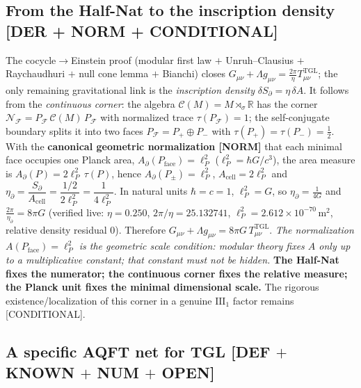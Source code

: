 \documentclass[11pt]{article}
\theoremstyle{definition}\newtheorem{deriv}{Derivation}
\begin{document}
\subsection*{From the Half-Nat to the inscription density \textsf{[DER + NORM + CONDITIONAL]}}

The cocycle$\to$Einstein proof (modular first law $+$ Unruh--Clausius $+$ Raychaudhuri $+$ null cone lemma $+$ Bianchi) closes $G_{\mu\nu}+\Lambda g_{\mu\nu}=\tfrac{2\pi}{\eta}T^{\mathrm{TGL}}_{\mu\nu}$; the only remaining gravitational link is the \emph{inscription density} $\delta S_\partial=\eta\,\delta A$. It follows from the \emph{continuous corner}: the algebra $\mathcal C(M)=M\rtimes_\sigma\mathbb R$ has the corner $\mathcal N_{\mathcal F}=P_{\mathcal F}\,\mathcal C(M)\,P_{\mathcal F}$ with normalized trace $\tau(P_{\mathcal F})=1$; the self-conjugate boundary splits it into two faces $P_{\mathcal F}=P_+\oplus P_-$ with $\tau(P_+)=\tau(P_-)=\tfrac12$. With the \textbf{canonical geometric normalization \textsf{[NORM]}} that each minimal face occupies one Planck area, $A_\partial(P_{\mathrm{face}})=\ell_P^2$ ($\ell_P^2=\hbar G/c^3$), the area measure is $A_\partial(P)=2\ell_P^2\,\tau(P)$, hence $A_\partial(P_\pm)=\ell_P^2$, $A_{\mathrm{cell}}=2\ell_P^2$ and $\eta_\partial=\dfrac{S_\partial}{A_{\mathrm{cell}}}=\dfrac{1/2}{2\ell_P^2}=\dfrac1{4\ell_P^2}$. In natural units $\hbar=c=1$, $\ell_P^2=G$, so $\eta_\partial=\tfrac1{4G}$ and $\tfrac{2\pi}{\eta_\partial}=8\pi G$ (verified live: $\eta=0.250$, $2\pi/\eta=25.132741$, $\ell_P^2=2.612\times10^{-70}\,\mathrm{m}^2$, relative density residual $0$). Therefore $G_{\mu\nu}+\Lambda g_{\mu\nu}=8\pi G\,T^{\mathrm{TGL}}_{\mu\nu}$. \emph{The normalization $A(P_{\mathrm{face}})=\ell_P^2$ is the geometric scale condition: modular theory fixes $A$ only up to a multiplicative constant; that constant must not be hidden.} \textbf{The Half-Nat fixes the numerator; the continuous corner fixes the relative measure; the Planck unit fixes the minimal dimensional scale.} The rigorous existence/localization of this corner in a genuine $\mathrm{III}_1$ factor remains \textsf{[CONDITIONAL]}.

\subsection*{A specific AQFT net for TGL \textsf{[DEF $+$ KNOWN $+$ NUM $+$ OPEN]}}
\end{document}
